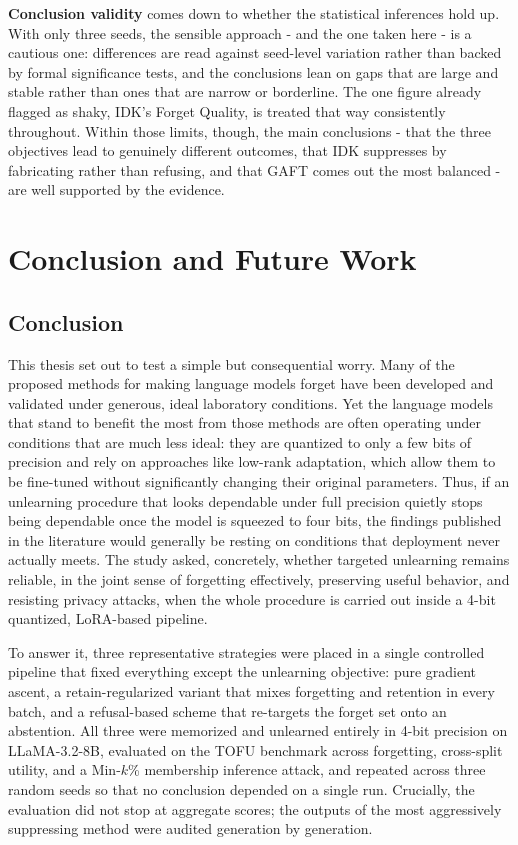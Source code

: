 \documentclass[a4paper,12pt]{report}
\begin{document}
\textbf{Conclusion validity} comes down to whether the statistical inferences hold up. With only three seeds, the sensible approach - and the one taken here - is a cautious one: differences are read against seed-level variation rather than backed by formal significance tests, and the conclusions lean on gaps that are large and stable rather than ones that are narrow or borderline. The one figure already flagged as shaky, IDK's Forget Quality, is treated that way consistently throughout. Within those limits, though, the main conclusions - that the three objectives lead to genuinely different outcomes, that IDK suppresses by fabricating rather than refusing, and that GAFT comes out the most balanced - are well supported by the evidence.

\chapter{Conclusion and Future Work}
\label{chap:conclusion}

\section{Conclusion}
This thesis set out to test a simple but consequential worry. Many of the proposed methods for making language models forget have been developed and validated under generous, ideal laboratory conditions. Yet the language models that stand to benefit the most from those methods are often operating under conditions that are much less ideal: they are quantized to only a few bits of precision and rely on approaches like low-rank adaptation, which allow them to be fine-tuned without significantly changing their original parameters. Thus, if an unlearning procedure that looks dependable under full precision quietly stops being dependable once the model is squeezed to four bits, the findings published in the literature would generally be resting on conditions that deployment never actually meets. The study asked, concretely, whether targeted unlearning remains reliable, in the joint sense of forgetting effectively, preserving useful behavior, and resisting privacy attacks, when the whole procedure is carried out inside a 4-bit quantized, LoRA-based pipeline.

To answer it, three representative strategies were placed in a single controlled pipeline that fixed everything except the unlearning objective: pure gradient ascent, a retain-regularized variant that mixes forgetting and retention in every batch, and a refusal-based scheme that re-targets the forget set onto an abstention. All three were memorized and unlearned entirely in 4-bit precision on LLaMA-3.2-8B, evaluated on the TOFU benchmark across forgetting, cross-split utility, and a Min-$k$\% membership inference attack, and repeated across three random seeds so that no conclusion depended on a single run. Crucially, the evaluation did not stop at aggregate scores; the outputs of the most aggressively suppressing method were audited generation by generation.
\end{document}
